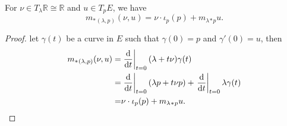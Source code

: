 \begin{lemma}\label{lem:tangent-map-of-multiplication}
    For $\nu\in T_\lambda \mathbb{R}\cong \mathbb{R}$ and $u\in T_p E$, we have 
    \begin{equation*}
        m_*{}_{(\lambda,p)}(\nu,u) = \nu\cdot\iota_p(p) + m_\lambda{}_*{}_p u.
    \end{equation*}
\end{lemma}
\begin{proof}
    let $\gamma(t)$ be a curve in $E$ such that $\gamma(0) = p$ and $\gamma'(0) = u$, then 
    \begin{align*}
        m_*{}_{(\lambda,p)}(\nu,u) =& \left.\frac{{\rm d} }{{\rm d} t}\right|_{t=0} (\lambda + t\nu)\gamma(t) \\
        =& \left.\frac{{\rm d} }{{\rm d} t}\right|_{t=0}(\lambda p + t\nu p) 
        + \left.\frac{{\rm d} }{{\rm d} t}\right|_{t=0} \lambda \gamma(t) \\
        =& \nu\cdot\iota_p(p) + m_\lambda{}_*{}_p u. \qedhere
    \end{align*} 
\end{proof}
